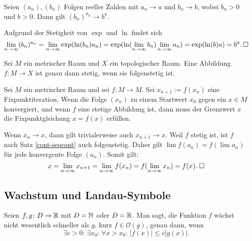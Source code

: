 \begin{Satz}
Seien $(a_n),(b_n)$ Folgen reeller Zahlen mit $a_n\to a$ und $b_n\to b$,
wobei $b_n>0$ und $b>0$. Dann gilt $(b_n)^{a_n}\to b^a$.
\end{Satz}
\begin{Beweis}
Aufgrund der Stetigkeit von $\exp$ und $\ln$ findet sich
\[\lim_{n\to\infty} (b_n)^{a_n} = \lim_{n\to\infty} \exp(\ln(b_n)a_n)
= \exp(\ln(\lim_{n\to\infty} b_n) \lim_{n\to\infty} a_n)
= \exp(\ln(b)a) = b^a.\,\square\]
\end{Beweis}

\newpage
\begin{Satz}\label{cont-seqcont}%
Sei $M$ ein metrischer Raum und $X$ ein topologischer Raum.
Eine Abbildung $f\colon M\to X$ ist genau dann stetig, wenn
sie folgenstetig ist.
\end{Satz}

\begin{Satz}
Sei $M$ ein metrischer Raum und sei $f\colon M\to M$.
Sei $x_{n+1}:=f(x_n)$ eine Fixpunktiteration. Wenn die Folge
$(x_n)$ zu einem Startwert $x_0$ gegen ein $x\in M$ konvergiert, und
wenn $f$ eine stetige Abbildung ist, dann muss der Grenzwert $x$ die
Fixpunktgleichung $x=f(x)$ erfüllen.
\end{Satz}

\begin{Beweis}
Wenn $x_n\to x$, dann gilt trivialerweise auch $x_{n+1}\to x$.
Weil $f$ stetig ist, ist $f$ nach Satz \ref{cont-seqcont}
auch folgenstetig. Daher gilt $\lim f(a_n) = f(\lim a_n)$ für jede
konvergente Folge $(a_n)$. Somit gilt:
\[x=\lim_{n\to\infty} x_{n+1} = \lim_{n\to\infty} f(x_n)
= f(\lim_{n\to\infty} x_n) = f(x).\;\square\]
\end{Beweis}

\subsection{Wachstum und Landau-Symbole}
\begin{Definition}\label{Landau-O}
Seien $f,g\colon D\to\mathbb R$ mit $D=\mathbb N$ oder $D=\mathbb R$. Man sagt, die
Funktion $f$ wächst nicht wesentlich schneller als $g$, kurz
$f\in\mathcal O(g)$, genau dann, wenn
\[\exists c{>}0\colon\,\exists x_0\colon\,\forall x{>}x_0\colon\, |f(x)|\le c|g(x)|.\]
\end{Definition}

